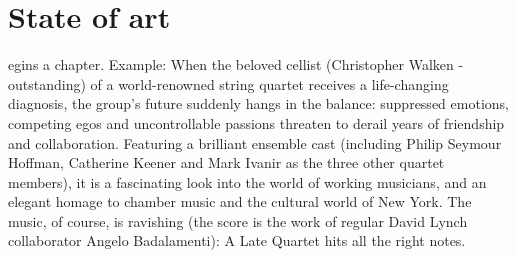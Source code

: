 %
%
\let\textcircled=\pgftextcircled
\chapter{State of art}
\label{chap:state_of_art}

egins a chapter. Example: When the beloved cellist (Christopher Walken - outstanding) of a world-renowned string quartet receives a life-changing diagnosis, the group's future suddenly hangs in the balance: suppressed emotions, competing egos and uncontrollable passions threaten to derail years of friendship and collaboration. Featuring a brilliant ensemble cast (including Philip Seymour Hoffman, Catherine Keener and Mark Ivanir as the three other quartet members), it is a fascinating look into the world of working musicians, and an elegant homage to chamber music and the cultural world of New York. The music, of course, is ravishing (the score is the work of regular David Lynch collaborator Angelo Badalamenti): A Late Quartet hits all the right notes.